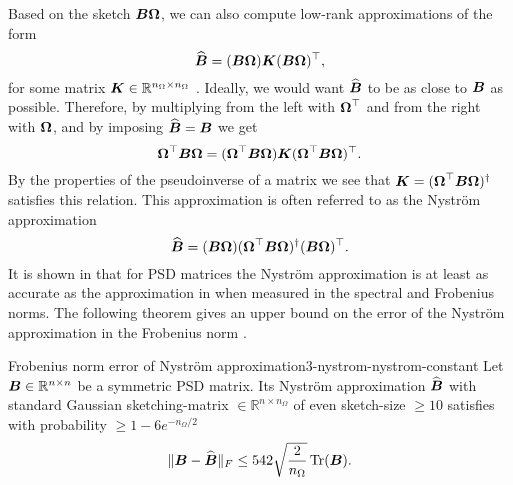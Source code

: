 Based on the sketch $\boldsymbol{B}\boldsymbol{\Omega}$, we can also compute low-rank approximations
of the form
\begin{equation}
    \widehat{\boldsymbol{B}} = (\boldsymbol{B} \boldsymbol{\Omega}) \boldsymbol{K} (\boldsymbol{B} \boldsymbol{\Omega})^{\top},
    \label{equ:3-nystrom-nystrom-general}
\end{equation}
for some matrix $\boldsymbol{K} \in \mathbb{R}^{n_{\Omega} \times n_{\Omega}}$ \cite[section~3.1]{lin2017randomized}.
Ideally, we would want $\widehat{\boldsymbol{B}}$ to be as close to $\boldsymbol{B}$ as possible. Therefore, by multiplying 
from the left with $\boldsymbol{\Omega}^{\top}$ and from the right with $\boldsymbol{\Omega}$,
and by imposing $\widehat{\boldsymbol{B}} = \boldsymbol{B}$ we get
\begin{equation}
    \boldsymbol{\Omega}^{\top} \boldsymbol{B} \boldsymbol{\Omega} = (\boldsymbol{\Omega}^{\top} \boldsymbol{B} \boldsymbol{\Omega}) \boldsymbol{K} (\boldsymbol{\Omega}^{\top} \boldsymbol{B} \boldsymbol{\Omega})^{\top}.
    \label{equ:3-nystrom-nystrom-unknown}
\end{equation}
By the properties of the pseudoinverse of a matrix we see that
$\boldsymbol{K} = (\boldsymbol{\Omega}^{\top} \boldsymbol{B} \boldsymbol{\Omega})^{\dagger}$ satisfies this
relation.
This approximation is often referred to as the Nystr\"om approximation \cite{gittens2013nystrom}
\begin{equation}
    \widehat{\boldsymbol{B}} = (\boldsymbol{B} \boldsymbol{\Omega}) (\boldsymbol{\Omega}^{\top} \boldsymbol{B} \boldsymbol{\Omega})^{\dagger} (\boldsymbol{B} \boldsymbol{\Omega})^{\top}.
    \label{equ:3-nystrom-nystrom}
\end{equation}
It is shown in \cite[lemma~5.2]{tropp2023randomized} that for \gls{PSD} matrices
the Nystr\"om approximation is at least as accurate as the approximation in
 when measured in the spectral
and Frobenius norms. The following theorem gives an upper bound on the error of the
Nystr\"om approximation in the Frobenius norm \cite[lemma~3.2]{persson2022hutch}.

\begin{theorem}{Frobenius norm error of Nystr\"om approximation}{3-nystrom-nystrom-constant}
    Let $\boldsymbol{B} \in \mathbb{R}^{n \times n}$ be a symmetric \gls{PSD} matrix. Its Nystr\"om approximation
    $\widehat{\boldsymbol{B}}$  with standard Gaussian
    \gls{sketching-matrix} $\in \mathbb{R}^{n \times n_{\Omega}}$ of even
    \gls{sketch-size} $\geq 10$
    satisfies with probability $\geq 1-6e^{-n_{\Omega}/2}$
    \begin{equation}
        \lVert \boldsymbol{B} - \widehat{\boldsymbol{B}} \rVert _F \leq 542\sqrt{\frac{2}{n_{\Omega}}} \operatorname{Tr}(\boldsymbol{B}).
    \end{equation}
\end{theorem}

